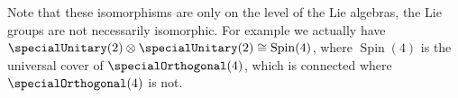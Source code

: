 \documentclass[fleqn]{NotesClass}
\newcommand{\isomorphic}{\cong}
\begin{document}
    Note that these isomorphisms are only on the level of the Lie algebras, the Lie groups are not necessarily isomorphic.
    For example we actually have \(\specialUnitary(2) \otimes \specialUnitary(2) \isomorphic \operatorname{Spin}(4)\), where \(\operatorname{Spin}(4)\) is the universal cover of \(\specialOrthogonal(4)\), which is connected where \(\specialOrthogonal(4)\) is not.
    
    
    \backmatter
    \printindex
\end{document}
